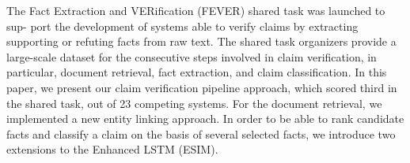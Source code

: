 The Fact Extraction and VERification (FEVER) shared task was launched to sup- port the development of systems able to verify claims by extracting supporting or refuting facts from raw text. The shared task organizers provide a large-scale dataset for the consecutive steps involved in claim verification, in particular, document retrieval, fact extraction, and claim classification. In this paper, we present our claim verification pipeline approach, which scored third in the shared task, out of 23 competing systems. For the document retrieval, we implemented a new entity linking approach. In order to be able to rank candidate facts and classify a claim on the basis of several selected facts, we introduce two extensions to the Enhanced LSTM (ESIM).
